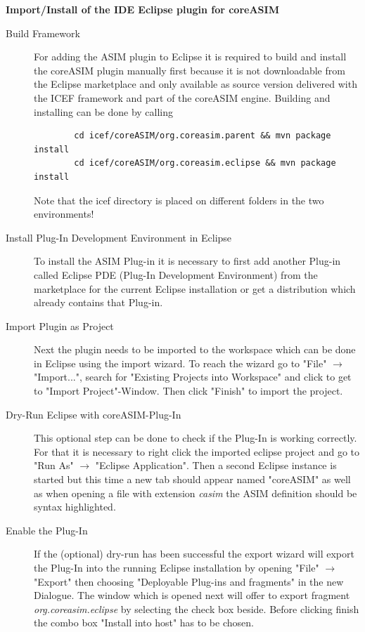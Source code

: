 \textbf{Import/Install of the IDE Eclipse plugin for coreASIM}
\begin{description}
	\item[Build Framework] For adding the ASIM plugin to Eclipse it is required to build and install the coreASIM plugin manually first because it is not downloadable from the Eclipse marketplace and only available as source version delivered with the ICEF framework and part of the coreASIM engine. Building and installing can be done by calling
	\begin{lstlisting}
		cd icef/coreASIM/org.coreasim.parent && mvn package install
		cd icef/coreASIM/org.coreasim.eclipse && mvn package install
	\end{lstlisting}
	Note that the icef directory is placed on different folders in the two environments!
	
	\item[Install Plug-In Development Environment in Eclipse] To install the ASIM Plug-in it is necessary to first add another Plug-in called Eclipse PDE (Plug-In Development Environment) from the marketplace for the current Eclipse installation or get a distribution which already contains that Plug-in.
	
	\item[Import Plugin as Project] Next the plugin needs to be imported to the workspace which can be done in Eclipse using the import wizard. To reach the wizard go to "File" $\rightarrow$ "Import...", search for "Existing Projects into Workspace" and click to get to "Import Project"-Window. Then click "Finish" to import the project.
	
	\item[Dry-Run Eclipse with coreASIM-Plug-In] This optional step can be done to check if the Plug-In is working correctly. For that it is necessary to right click the imported eclipse project and go to "Run As" $\rightarrow$ "Eclipse Application". Then a second Eclipse instance is started but this time a new tab should appear named "coreASIM" as well as when opening a file with extension \textit{casim} the ASIM definition should be syntax highlighted.

	\item[Enable the Plug-In] If the (optional) dry-run has been successful the export wizard will export the Plug-In into the running Eclipse installation by opening "File" $\rightarrow$  "Export" then choosing "Deployable Plug-ins and fragments" in the new Dialogue. The window which is opened next will offer to export fragment  \textit{org.coreasim.eclipse} by selecting the check box beside. Before clicking finish the combo box "Install into host" has to be chosen.
	
\end{description}

